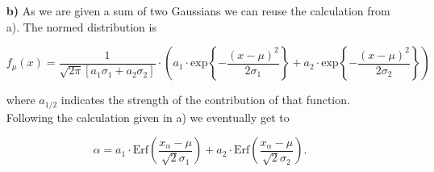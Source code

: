 \documentclass[10pt]{article}
\newenvironment{myfont}{\fontfamily{put}\selectfont}{\par}
\begin{document}
\begin{myfont}
\begin{itemize}
  \begin{align}
    \alpha & = 2 \cdot \int\limits_{\mu}^{x_{\alpha}} \textrm{d}x \cdot \frac{1}{\sqrt{2\pi}\sigma} \textrm{exp}\left\{-\frac{(x - \mu)^{2}}{2\sigma^{2}}\right\} \nonumber\\
     & = 2 \frac{1}{\sqrt{2\pi}\sigma} \cdot \sqrt{\frac{\pi}{2}} \sigma \cdot \textrm{Erf}\left(\frac{x_{\alpha} - \mu}{\sqrt{2}\sigma}\right) \nonumber\\
     & = \textrm{Erf}\left(\frac{x_{\alpha} - \mu}{\sqrt{2}\sigma}\right) \nonumber\\
     \rightarrow x_{\alpha} &= \mu + \sqrt{2}\sigma \cdot \textrm{Erf}^{-1}\left(\alpha\right)
  \end{align}

  \noindent Here $\textrm{Erf}^{-1}$ denotes the inverse error function.

  \begin{adjustwidth}{1.5cm}{1.5cm}
    \noindent For $\alpha =$ \num{0.680}: $x_{\alpha} \in [\num{140.055}, \num{159.945}]$. \\
    \noindent For $\alpha =$ \num{0.950}: $x_{\alpha} \in [\num{130.400}, \num{169.599}]$. \\
    \noindent For $\alpha =$ \num{0.997}: $x_{\alpha} \in [\num{120.322}, \num{179.677}]$. \\
  \end{adjustwidth}

  \item[\textbf{b)}] As we are given a sum of two Gaussians we can reuse the calculation from a).
  The normed distribution is

  \begin{equation}
    f_{\mu}(x) = \frac{1}{\sqrt{2\pi}\left[a_{1}\sigma_{1} + a_{2}\sigma_{2}\right]} \cdot \left(a_{1} \cdot \textrm{exp}\left\{-\frac{(x - \mu)^{2}}{2\sigma_{1}}\right\} + a_{2} \cdot \textrm{exp}\left\{-\frac{(x - \mu)^{2}}{2\sigma_{2}}\right\}\right)
  \end{equation}

  \noindent where $a_{1/2}$ indicates the strength of the contribution of that function.
  Following the calculation given in a) we eventually get to

  \begin{equation}
    \alpha = a_{1} \cdot \textrm{Erf}\left(\frac{x_{\alpha} - \mu}{\sqrt{2}\sigma_{1}}\right) + a_{2} \cdot \textrm{Erf}\left(\frac{x_{\alpha} - \mu}{\sqrt{2}\sigma_{2}}\right).
  \end{equation}


\end{itemize}
\end{myfont}
\end{document}
